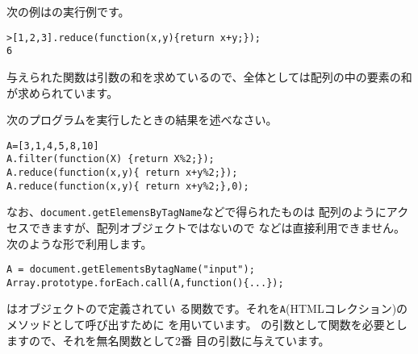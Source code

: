 次の例はの実行例です。
\begin{Verbatim}
>[1,2,3].reduce(function(x,y){return x+y;});
6
\end{Verbatim}
与えられた関数は引数の和を求めているので、全体としては配列の中の要素の和
が求められています。
\begin{Problem}\upshape
 次のプログラムを実行したときの結果を述べなさい。
\begin{Verbatim}
A=[3,1,4,5,8,10]
A.filter(function(X) {return X%2;});
A.reduce(function(x,y){ return x+y%2;});
A.reduce(function(x,y){ return x+y%2;},0);
\end{Verbatim}
\end{Problem}
\iffalse
\ref{argumentsSum}で\ElmJ{arguments}の総和をとる関数を作成しています。
この部分を\ElmJA{reduce}で置き換えるとうまくいきません。
\begin{Verbatim}
>function sum() {return arguments.reduce(function(x,y){return x+y;})}
undefined
>sum(1,2,3);
VM510:2 Uncaught TypeError: arguments.reduce is not a function(…)
\end{Verbatim}
「\ElmJ{arguments}には\ElmJA{reduce}という関数がない」というメッセージが
表示されています。これからも、\ElmJ{arguments}は配列のようなものだけれど
も配列とは違うことがわかります。

これを解決するにはオブジェクトのメソッドとして関数を呼び出す\ElmJ{call}
を使用します。
\begin{Verbatim}
>function sum(){return Array.prototype.reduce.call(arguments,function(x,y){return x+y;})}
undefined
>sum(1,2,3);
6
\end{Verbatim}
\ElmJA{reduce}は\ElmJ{Array}オブジェクトの\ElmJ{prototype}で定義されてい
る関数です。それを\ElmJ{arguments}のメソッドとして呼び出すために
\ElmJ{call}を用いています。
\ElmJ{reduce}の引数として関数を必要としますので、それを無名関数として2番
目の引数に与えています。

\verb+document.getElemensByTagName+などで得られた
配列のようなものに対して\ElmJA{forEach}などを利用したい場合にもこの手法
が利用できます。
\else
なお、\verb+document.getElemensByTagName+などで得られたものは
配列のようにアクセスできますが、配列オブジェクトではないので
などは直接利用できません。次のような形で利用します。

\begin{Verbatim}
A = document.getElementsBytagName("input");
Array.prototype.forEach.call(A,function(){...});
\end{Verbatim}
はオブジェクトので定義されてい
る関数です。それを\texttt{A}(HTMLコレクション)のメソッドとして呼び出すために
を用いています。
の引数として関数を必要としますので、それを無名関数として2番
目の引数に与えています。
\fi

